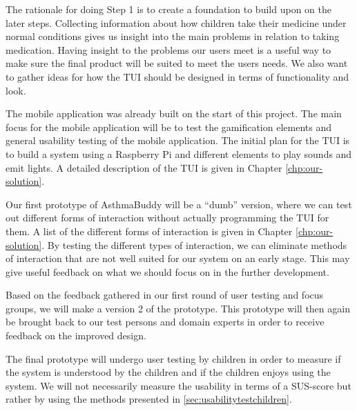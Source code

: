 The rationale for doing Step 1 is to create a foundation to build upon on the later steps. 
Collecting information about how children take their medicine under normal conditions gives us insight into the main problems in relation to taking medication. Having insight to the problems our users meet is a useful way to make sure the final product will be suited to meet the users needs. We also want to gather ideas for how the TUI should be designed in terms of functionality and look.

The mobile application was already built on the start of this project. The main focus for the mobile application will be to test the gamification elements and general usability testing of the mobile application. The initial plan for the TUI is to build a system using a Raspberry Pi and different elements to play sounds and emit lights. A detailed description of the TUI is given in Chapter \ref{chp:our-solution}. 

Our first prototype of AsthmaBuddy will be a ``dumb'' version, where we can test out different forms of interaction without actually programming the TUI for them. A list of the different forms of interaction is given in Chapter \ref{chp:our-solution}. By testing the different types of interaction, we can eliminate methods of interaction that are not well suited for our system on an early stage. This may give useful feedback on what we should focus on in the further development. 

Based on the feedback gathered in our first round of user testing and focus groups, we will make a version 2 of the prototype. This prototype will then again be brought back to our test persons and domain experts in order to receive feedback on the improved design.

The final prototype will undergo user testing by children in order to measure if the system is understood by the children and if the children enjoys using the system. We will not necessarily measure the usability in terms of a SUS-score\cite{brooke1996sus} but rather by using the methods presented in \ref{sec:usabilitytestchildren}.
